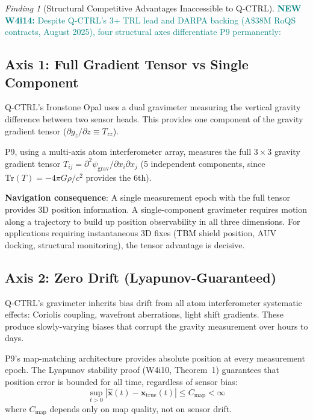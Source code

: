 \documentclass[11pt]{article}
\theoremstyle{definition}
\theoremstyle{remark}
\newtheorem{finding}[theorem]{Finding}
\newcommand{\psigrav}{\psi_{\mathrm{grav}}}
\newcommand{\newfinding}[1]{\textcolor{teal}{\textbf{NEW W4i14:} #1}}
\begin{document}
\begin{finding}[Structural Competitive Advantages Inaccessible to Q-CTRL]
\label{find:competitive-moat}
\newfinding{Despite Q-CTRL's 3+ TRL lead and DARPA backing (A\$38M RoQS
contracts, August 2025), four structural axes differentiate P9 permanently:}

\subsection*{Axis 1: Full Gradient Tensor vs Single Component}

Q-CTRL's Ironstone Opal uses a dual gravimeter measuring the vertical
gravity difference between two sensor heads. This provides one component
of the gravity gradient tensor ($\partial g_z / \partial z \equiv T_{zz}$).

P9, using a multi-axis atom interferometer array, measures the full
$3\times 3$ gravity gradient tensor $T_{ij} = \partial^2\psigrav /
\partial x_i \partial x_j$ (5 independent components, since
$\mathrm{Tr}(T) = -4\pi G\rho/c^2$ provides the 6th).

\textbf{Navigation consequence}: A single measurement epoch with the
full tensor provides 3D position information. A single-component
gravimeter requires motion along a trajectory to build up position
observability in all three dimensions. For applications requiring
instantaneous 3D fixes (TBM shield position, AUV docking, structural
monitoring), the tensor advantage is decisive.

\subsection*{Axis 2: Zero Drift (Lyapunov-Guaranteed)}

Q-CTRL's gravimeter inherits bias drift from all atom interferometer
systematic effects: Coriolis coupling, wavefront aberrations, light
shift gradients. These produce slowly-varying biases that corrupt
the gravity measurement over hours to days.

P9's map-matching architecture provides absolute position at every
measurement epoch. The Lyapunov stability proof (W4i10, Theorem~1)
guarantees that position error is bounded for all time, regardless
of sensor bias:
\begin{equation}
\sup_{t>0} |\hat{\mathbf{x}}(t) - \mathbf{x}_{\mathrm{true}}(t)|
\leq C_{\mathrm{map}} < \infty
\label{eq:lyapunov-bound}
\end{equation}
where $C_{\mathrm{map}}$ depends only on map quality, not on sensor drift.


\end{finding}
\end{document}
